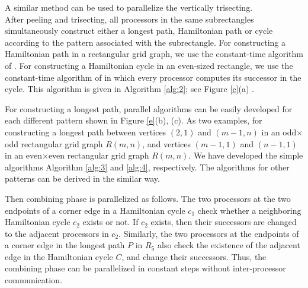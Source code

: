 \documentclass[preprint,12pt]{elsarticle}
\begin{document}
A similar method can be used to parallelize the vertically
trisecting.\\
After peeling and trisecting, all processors in the same
subrectangles simultaneously construct either a longest path,
Hamiltonian path or cycle according to the pattern associated with
the subrectangle. For constructing a Hamiltonian path in a
rectangular grid graph, we use the constant-time algorithm of
\cite{CST:AFAFCHPIM}. For constructing a Hamiltonian cycle in an
even-sized rectangle, we use the constant-time algorithm of
\cite{SST:EPPRAOM} in which every processor computes its successor
in the cycle. This algorithm is given in Algorithm \ref{alg:2}; see
Figure \ref{e}(a) .\par For constructing a longest path, parallel
algorithms can be easily developed for each different pattern shown
in  Figure \ref{e}(b), (c). As two examples, for constructing a
longest path between vertices $(2,1)$ and $(m-1,n)$ in an
odd$\times$odd rectangular grid graph $R(m,n)$, and vertices
$(m-1,1)$ and $(n-1,1) $ in an even$\times$even rectangular grid
graph $R(m,n)$. We have developed the simple algorithms Algorithm
\ref{alg:3} and \ref{alg:4}, respectively. The algorithms for other
patterns can be derived in the similar way. \par Then combining
phase is parallelized as follows.  The two processors at the two
endpoints of a corner edge in a Hamiltonian cycle $c_1$ check
whether a neighboring Hamiltonian cycle $c_2$ exists or not. If
$c_2$ exists, then their successors are changed to the adjacent
processors in $c_2$. Similarly, the two processors at the endpoints
of a corner edge in the longest path $P$ in $R_5$ also check the
existence of the adjacent edge in the Hamiltonian cycle $C$, and
change their successors. Thus, the combining phase can be
parallelized in constant steps without inter-processor
communication.
\end{document}
